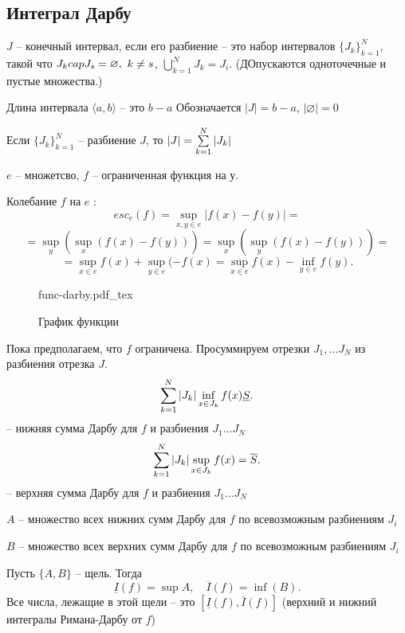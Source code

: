 \documentclass[12pt]{report}
\newcommand{\incfig}[1]{%
    \def\svgwidth{\columnwidth}
    {#1.pdf_tex}
}
\begin{document}
\subsection{Интеграл Дарбу}
\begin{defn}
    $ J$ -- конечный интервал, если его разбиение -- это набор  интервалов $ \{J_k\}^{N}_{k=1}$, такой что $ J_k \\cap  J_s = \varnothing, ~k \ne s $,
    $ \bigcup_{k=1}^{{N}} J_k = J_i $. (ДОпускаются одноточечные и пустые множества.)

\end{defn}
    \begin{defn}
    Длина интервала $ \langle a, b \rangle$ -- это $ b - a$
    Обозначается $ |J| = b-a$, $ |\varnothing| = 0$
\end{defn}
\begin{lm}
    Если $ \{J_k\}_{k= 1}^{N}$ -- разбиение $ J$, то $|J| = \sum\limits_{k=1}^{N}  |J_k|$
\end{lm}
\begin{defn}
    $ e$ -- множетсво, $ f$ -- ограниченная функция на $ у$. 

    Колебание $ f$ на $  e$ :
    \[
	esc_e (f) = \sup_{x, y \in  e} |f(x) - f(y)|= 
    \]
    \[
=	\sup_{y} \left( \sup_x (f(x) - f(y)) \right)  = \sup_x \left( \sup_y (f(x) - f(y))  \right) =
    \] 
    \[
	=\sup_{x \in  e}  f(x)  + \sup_{y \in  e}(-f(x) = \sup _{x \in  e} f(x) - \inf_{y \in  e} f(y)
    .\] 
\end{defn}
\begin{figure}[ht]
    \centering
    \incfig{func-darby}
    \caption{График функции}
    \label{fig:func-darby}
\end{figure}
Пока предполагаем, что $ f$ ограничена.
Просуммируем отрезки $ J_1, \ldots J_N $ из разбиения отрезка $ J$.
\[
    \sum\limits_{k= 1}^{N} |J_k|\inf_{x \in  J_k} f(x) \underline{S}
.\] -- нижняя сумма Дарбу  для $ f$ и разбиения $ J_1 \ldots  J_N$
\[
\sum\limits_{k= 1}^{N} |J_k|\sup_{x \in  J_k} f(x) =\overline{S}
.\] -- верхняя сумма Дарбу  для $ f$ и разбиения $ J_1 \ldots  J_N$
\begin{name}
    $ A$ -- множество всех нижних сумм Дарбу для $ f$ по всевозможным разбиениям $ J_i$

    $ B$ -- множество всех верхних сумм Дарбу для $ f$ по всевозможным разбиениям $ J_i$
\end{name}
\begin{st}
    Пусть $ \{A, B\}$ -- щель. Тогда  
    \[
	\underline{I}(f) = \sup{ A} , \quad \overline{I}(f) = \inf(B)
    .\] 
    Все числа, лежащие в этой щели -- это $ [ \underline{I} (f) , \overline{I}(f)]$ (верхний и нижний интегралы Римана-Дарбу от $ f$)
\end{st}
\end{document}
